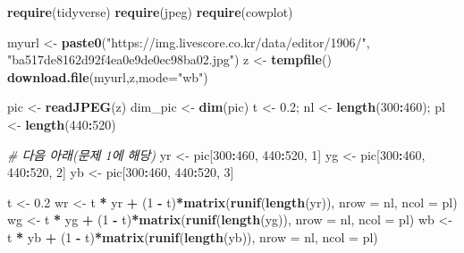\documentclass[
  11pt,
]{krantz}
\newenvironment{Shaded}{\begin{snugshade}}{\end{snugshade}}
\newcommand{\CommentTok}[1]{\textcolor[rgb]{0.37,0.37,0.37}{\textit{#1}}}
\newcommand{\DataTypeTok}[1]{\textcolor[rgb]{0.27,0.27,0.27}{#1}}
\newcommand{\DecValTok}[1]{\textcolor[rgb]{0.06,0.06,0.06}{#1}}
\newcommand{\FloatTok}[1]{\textcolor[rgb]{0.06,0.06,0.06}{#1}}
\newcommand{\KeywordTok}[1]{\textcolor[rgb]{0.27,0.27,0.27}{\textbf{#1}}}
\newcommand{\NormalTok}[1]{#1}
\newcommand{\OperatorTok}[1]{\textcolor[rgb]{0.43,0.43,0.43}{\textbf{#1}}}
\newcommand{\StringTok}[1]{\textcolor[rgb]{0.5,0.5,0.5}{#1}}
\begin{document}
\begin{Shaded}
\begin{Highlighting}[]
\KeywordTok{require}\NormalTok{(tidyverse)}
\KeywordTok{require}\NormalTok{(jpeg)}
\KeywordTok{require}\NormalTok{(cowplot)}

\NormalTok{myurl <-}\StringTok{ }\KeywordTok{paste0}\NormalTok{(}\StringTok{"https://img.livescore.co.kr/data/editor/1906/"}\NormalTok{, }
                \StringTok{"ba517de8162d92f4ea0e9de0ec98ba02.jpg"}\NormalTok{)}
\NormalTok{z <-}\StringTok{ }\KeywordTok{tempfile}\NormalTok{()}
\KeywordTok{download.file}\NormalTok{(myurl,z,}\DataTypeTok{mode=}\StringTok{"wb"}\NormalTok{)}

\NormalTok{pic <-}\StringTok{ }\KeywordTok{readJPEG}\NormalTok{(z)}
\NormalTok{dim_pic <-}\StringTok{ }\KeywordTok{dim}\NormalTok{(pic)}
\NormalTok{t <-}\StringTok{ }\FloatTok{0.2}\NormalTok{; nl <-}\StringTok{ }\KeywordTok{length}\NormalTok{(}\DecValTok{300}\OperatorTok{:}\DecValTok{460}\NormalTok{); pl <-}\StringTok{ }\KeywordTok{length}\NormalTok{(}\DecValTok{440}\OperatorTok{:}\DecValTok{520}\NormalTok{)}

\CommentTok{# 다음 아래(문제 1에 해당)}
\NormalTok{yr <-}\StringTok{ }\NormalTok{pic[}\DecValTok{300}\OperatorTok{:}\DecValTok{460}\NormalTok{, }\DecValTok{440}\OperatorTok{:}\DecValTok{520}\NormalTok{, }\DecValTok{1}\NormalTok{]}
\NormalTok{yg <-}\StringTok{ }\NormalTok{pic[}\DecValTok{300}\OperatorTok{:}\DecValTok{460}\NormalTok{, }\DecValTok{440}\OperatorTok{:}\DecValTok{520}\NormalTok{, }\DecValTok{2}\NormalTok{]}
\NormalTok{yb <-}\StringTok{ }\NormalTok{pic[}\DecValTok{300}\OperatorTok{:}\DecValTok{460}\NormalTok{, }\DecValTok{440}\OperatorTok{:}\DecValTok{520}\NormalTok{, }\DecValTok{3}\NormalTok{]}

\NormalTok{t <-}\StringTok{ }\FloatTok{0.2}
\NormalTok{wr <-}\StringTok{ }\NormalTok{t }\OperatorTok{*}\StringTok{ }\NormalTok{yr }\OperatorTok{+}\StringTok{ }\NormalTok{(}\DecValTok{1} \OperatorTok{-}\StringTok{ }\NormalTok{t)}\OperatorTok{*}\KeywordTok{matrix}\NormalTok{(}\KeywordTok{runif}\NormalTok{(}\KeywordTok{length}\NormalTok{(yr)), }\DataTypeTok{nrow =}\NormalTok{ nl, }\DataTypeTok{ncol =}\NormalTok{ pl)}
\NormalTok{wg <-}\StringTok{ }\NormalTok{t }\OperatorTok{*}\StringTok{ }\NormalTok{yg }\OperatorTok{+}\StringTok{ }\NormalTok{(}\DecValTok{1} \OperatorTok{-}\StringTok{ }\NormalTok{t)}\OperatorTok{*}\KeywordTok{matrix}\NormalTok{(}\KeywordTok{runif}\NormalTok{(}\KeywordTok{length}\NormalTok{(yg)), }\DataTypeTok{nrow =}\NormalTok{ nl, }\DataTypeTok{ncol =}\NormalTok{ pl)}
\NormalTok{wb <-}\StringTok{ }\NormalTok{t }\OperatorTok{*}\StringTok{ }\NormalTok{yb }\OperatorTok{+}\StringTok{ }\NormalTok{(}\DecValTok{1} \OperatorTok{-}\StringTok{ }\NormalTok{t)}\OperatorTok{*}\KeywordTok{matrix}\NormalTok{(}\KeywordTok{runif}\NormalTok{(}\KeywordTok{length}\NormalTok{(yb)), }\DataTypeTok{nrow =}\NormalTok{ nl, }\DataTypeTok{ncol =}\NormalTok{ pl)}



\end{Highlighting}
\end{Shaded}
\end{document}
